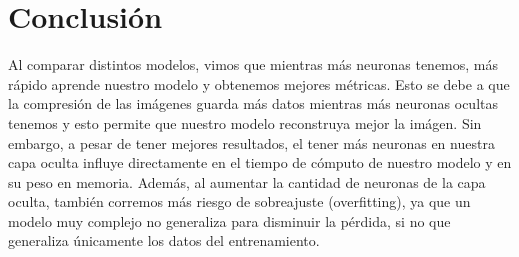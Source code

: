 \documentclass[a4paper,12pt,oneside,final]{article}
\begin{document}
\section{Conclusión}

Al comparar distintos modelos, vimos que mientras más neuronas tenemos, más rápido aprende nuestro modelo y obtenemos mejores métricas. Esto se debe a que la compresión de las imágenes guarda más datos mientras más neuronas ocultas tenemos y esto permite que nuestro modelo reconstruya mejor la imágen. Sin embargo, a pesar de tener mejores resultados, el tener más neuronas en nuestra capa oculta influye directamente en el tiempo de cómputo de nuestro modelo y en su peso en memoria. Además, al aumentar la cantidad de neuronas de la capa oculta, también corremos más riesgo de sobreajuste (overfitting), ya que un modelo muy complejo no generaliza para disminuir la pérdida, si no que generaliza únicamente los datos del entrenamiento.
\end{document}
